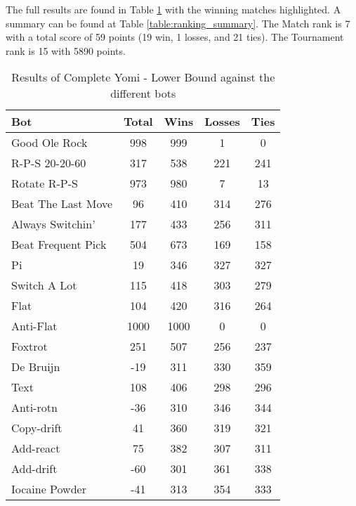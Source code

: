 The full results are found in Table \ref{table:Yomi_LowerBound_results} with the winning matches highlighted. A summary can be found at Table \ref{table:ranking_summary}. The Match rank is 7 with a total score of 59 points (19 win, 1 losses, and 21 ties). The Tournament rank is 15 with 5890 points.

\begin{table}
    \caption{Results of Complete Yomi - Lower Bound against the different bots}
    \label{table:Yomi_LowerBound_results}
    \centering
    \begin{tabular}{|l|c|c|c|c|}
        \hline
        \textbf{Bot} & \textbf{Total} & \textbf{Wins} & \textbf{Losses} & \textbf{Ties} \\ \hline
\rowcolor{HighlightRowColor} Good Ole Rock & 998 & 999 & 1 & 0 \\ \hline 
\rowcolor{HighlightRowColor} R-P-S 20-20-60 & 317 & 538 & 221 & 241 \\ \hline 
\rowcolor{HighlightRowColor} Rotate R-P-S & 973 & 980 & 7 & 13 \\ \hline 
\rowcolor{HighlightRowColor} Beat The Last Move & 96 & 410 & 314 & 276 \\ \hline 
\rowcolor{HighlightRowColor} Always Switchin' & 177 & 433 & 256 & 311 \\ \hline 
\rowcolor{HighlightRowColor} Beat Frequent Pick & 504 & 673 & 169 & 158 \\ \hline 
Pi & 19 & 346 & 327 & 327 \\ \hline 
\rowcolor{HighlightRowColor} Switch A Lot & 115 & 418 & 303 & 279 \\ \hline 
\rowcolor{HighlightRowColor} Flat & 104 & 420 & 316 & 264 \\ \hline 
\rowcolor{HighlightRowColor} Anti-Flat & 1000 & 1000 & 0 & 0 \\ \hline 
\rowcolor{HighlightRowColor} Foxtrot & 251 & 507 & 256 & 237 \\ \hline 
De Bruijn & -19 & 311 & 330 & 359 \\ \hline 
\rowcolor{HighlightRowColor} Text & 108 & 406 & 298 & 296 \\ \hline 
Anti-rotn & -36 & 310 & 346 & 344 \\ \hline 
Copy-drift & 41 & 360 & 319 & 321 \\ \hline 
\rowcolor{HighlightRowColor} Add-react & 75 & 382 & 307 & 311 \\ \hline 
Add-drift & -60 & 301 & 361 & 338 \\ \hline 
Iocaine Powder & -41 & 313 & 354 & 333 \\ \hline 

\end{tabular}
\end{table}
